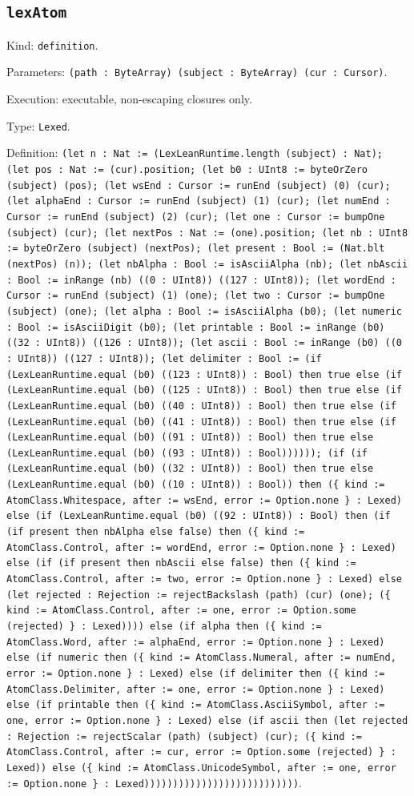 \documentclass[11pt]{article}
\begin{document}
\subsection*{\texttt{lexAtom}}
\noindent Kind: \texttt{definition}.\par
\noindent Parameters: \texttt{(path : ByteArray) (subject : ByteArray) (cur : Cursor)}.\par
\noindent Execution: executable, non-escaping closures only.\par
\noindent Type: \texttt{Lexed}.\par
\noindent Definition: \texttt{(let n : Nat := (LexLeanRuntime.length (subject) : Nat); (let pos : Nat := (cur).position; (let b0 : UInt8 := byteOrZero (subject) (pos); (let wsEnd : Cursor := runEnd (subject) (0) (cur); (let alphaEnd : Cursor := runEnd (subject) (1) (cur); (let numEnd : Cursor := runEnd (subject) (2) (cur); (let one : Cursor := bumpOne (subject) (cur); (let nextPos : Nat := (one).position; (let nb : UInt8 := byteOrZero (subject) (nextPos); (let present : Bool := (Nat.blt (nextPos) (n)); (let nbAlpha : Bool := isAsciiAlpha (nb); (let nbAscii : Bool := inRange (nb) ((0 : UInt8)) ((127 : UInt8)); (let wordEnd : Cursor := runEnd (subject) (1) (one); (let two : Cursor := bumpOne (subject) (one); (let alpha : Bool := isAsciiAlpha (b0); (let numeric : Bool := isAsciiDigit (b0); (let printable : Bool := inRange (b0) ((32 : UInt8)) ((126 : UInt8)); (let ascii : Bool := inRange (b0) ((0 : UInt8)) ((127 : UInt8)); (let delimiter : Bool := (if (LexLeanRuntime.equal (b0) ((123 : UInt8)) : Bool) then true else (if (LexLeanRuntime.equal (b0) ((125 : UInt8)) : Bool) then true else (if (LexLeanRuntime.equal (b0) ((40 : UInt8)) : Bool) then true else (if (LexLeanRuntime.equal (b0) ((41 : UInt8)) : Bool) then true else (if (LexLeanRuntime.equal (b0) ((91 : UInt8)) : Bool) then true else (LexLeanRuntime.equal (b0) ((93 : UInt8)) : Bool)))))); (if (if (LexLeanRuntime.equal (b0) ((32 : UInt8)) : Bool) then true else (LexLeanRuntime.equal (b0) ((10 : UInt8)) : Bool)) then (\{ kind := AtomClass.Whitespace, after := wsEnd, error := Option.none \} : Lexed) else (if (LexLeanRuntime.equal (b0) ((92 : UInt8)) : Bool) then (if (if present then nbAlpha else false) then (\{ kind := AtomClass.Control, after := wordEnd, error := Option.none \} : Lexed) else (if (if present then nbAscii else false) then (\{ kind := AtomClass.Control, after := two, error := Option.none \} : Lexed) else (let rejected : Rejection := rejectBackslash (path) (cur) (one); (\{ kind := AtomClass.Control, after := one, error := Option.some (rejected) \} : Lexed)))) else (if alpha then (\{ kind := AtomClass.Word, after := alphaEnd, error := Option.none \} : Lexed) else (if numeric then (\{ kind := AtomClass.Numeral, after := numEnd, error := Option.none \} : Lexed) else (if delimiter then (\{ kind := AtomClass.Delimiter, after := one, error := Option.none \} : Lexed) else (if printable then (\{ kind := AtomClass.AsciiSymbol, after := one, error := Option.none \} : Lexed) else (if ascii then (let rejected : Rejection := rejectScalar (path) (subject) (cur); (\{ kind := AtomClass.Control, after := cur, error := Option.some (rejected) \} : Lexed)) else (\{ kind := AtomClass.UnicodeSymbol, after := one, error := Option.none \} : Lexed)))))))))))))))))))))))))))}.\par
\end{document}
